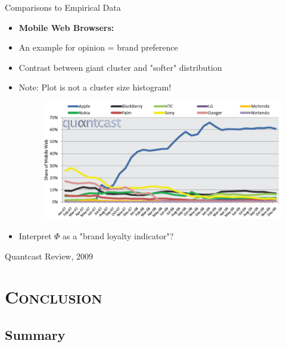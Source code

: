 \documentclass[xcolor=x11names,compress]{beamer}
\renewcommand{\(}{\begin{columns}}
\renewcommand{\)}{\end{columns}}
\newcommand{\<}[1]{\begin{column}{#1}}
\renewcommand{\>}{\end{column}}
\begin{document}

\begin{frame}{Comparisons to Empirical Data}

\begin{itemize}


\item \textbf{Mobile Web Browsers:}
\item An example for opinion = brand preference
\item Contrast between giant cluster and "softer" distribution
\item Note: Plot is not a cluster size histogram!



\begin{figure}
    \includegraphics[scale=0.3]{Graphics/mobile_web.pdf}
\end{figure}

\item Interpret $\Phi$ as a "brand loyalty indicator"?

\end{itemize}

\begin{tiny}
Quantcast Review, 2009 \cite{quantcast}
\end{tiny}

\end{frame}



\section{\scshape Conclusion}

\subsection{Summary}
\end{document}
